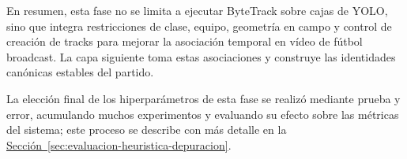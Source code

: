 En resumen, esta fase no se limita a ejecutar ByteTrack sobre cajas de YOLO, sino que integra restricciones de clase, equipo, geometría en campo y control de creación de tracks para mejorar la asociación temporal en vídeo de fútbol broadcast. La capa siguiente toma estas asociaciones y construye las identidades canónicas estables del partido.

La elección final de los hiperparámetros de esta fase se realizó mediante prueba y error, acumulando muchos experimentos y evaluando su efecto sobre las métricas del sistema; este proceso se describe con más detalle en la \hyperref[sec:evaluacion-heuristica-depuracion]{Sección~\ref*{sec:evaluacion-heuristica-depuracion}}.